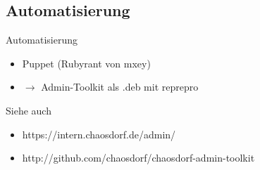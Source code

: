 \documentclass{beamer}
\begin{document}
\subsection{Automatisierung}
\begin{frame}{Automatisierung}
	\begin{itemize}
		\item Puppet (Rubyrant von mxey)
		\item $\rightarrow$ Admin-Toolkit als .deb mit reprepro
	\end{itemize}
\end{frame}

\begin{frame}{Siehe auch}
	\begin{itemize}
		\item https://intern.chaosdorf.de/admin/
		\item http://github.com/chaosdorf/chaosdorf-admin-toolkit
	\end{itemize}
\end{frame}
\end{document}
